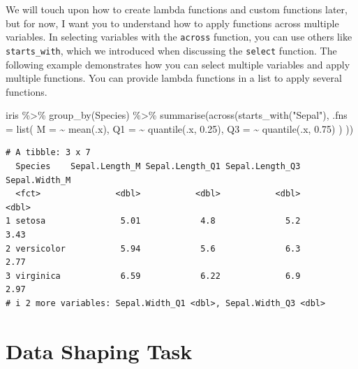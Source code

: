 \documentclass[
  a4paper,
]{book}
\newenvironment{Shaded}{\begin{snugshade}}{\end{snugshade}}
\newcommand{\AttributeTok}[1]{\textcolor[rgb]{0.40,0.45,0.13}{#1}}
\newcommand{\FloatTok}[1]{\textcolor[rgb]{0.68,0.00,0.00}{#1}}
\newcommand{\FunctionTok}[1]{\textcolor[rgb]{0.28,0.35,0.67}{#1}}
\newcommand{\NormalTok}[1]{\textcolor[rgb]{0.00,0.23,0.31}{#1}}
\newcommand{\SpecialCharTok}[1]{\textcolor[rgb]{0.37,0.37,0.37}{#1}}
\newcommand{\StringTok}[1]{\textcolor[rgb]{0.13,0.47,0.30}{#1}}
\begin{document}
We will touch upon how to create lambda functions and custom functions
later, but for now, I want you to understand how to apply functions
across multiple variables. In selecting variables with the
\texttt{across} function, you can use others like \texttt{starts\_with},
which we introduced when discussing the \texttt{select} function. The
following example demonstrates how you can select multiple variables and
apply multiple functions. You can provide lambda functions in a list to
apply several functions.

\begin{Shaded}
\begin{Highlighting}[]
\NormalTok{iris }\SpecialCharTok{\%\textgreater{}\%}
  \FunctionTok{group\_by}\NormalTok{(Species) }\SpecialCharTok{\%\textgreater{}\%}
  \FunctionTok{summarise}\NormalTok{(}\FunctionTok{across}\NormalTok{(}\FunctionTok{starts\_with}\NormalTok{(}\StringTok{"Sepal"}\NormalTok{),}
    \AttributeTok{.fns =} \FunctionTok{list}\NormalTok{(}
      \AttributeTok{M =} \SpecialCharTok{\textasciitilde{}} \FunctionTok{mean}\NormalTok{(.x),}
      \AttributeTok{Q1 =} \SpecialCharTok{\textasciitilde{}} \FunctionTok{quantile}\NormalTok{(.x, }\FloatTok{0.25}\NormalTok{),}
      \AttributeTok{Q3 =} \SpecialCharTok{\textasciitilde{}} \FunctionTok{quantile}\NormalTok{(.x, }\FloatTok{0.75}\NormalTok{)}
\NormalTok{    )}
\NormalTok{  ))}
\end{Highlighting}
\end{Shaded}

\begin{verbatim}
# A tibble: 3 x 7
  Species    Sepal.Length_M Sepal.Length_Q1 Sepal.Length_Q3 Sepal.Width_M
  <fct>               <dbl>           <dbl>           <dbl>         <dbl>
1 setosa               5.01            4.8              5.2          3.43
2 versicolor           5.94            5.6              6.3          2.77
3 virginica            6.59            6.22             6.9          2.97
# i 2 more variables: Sepal.Width_Q1 <dbl>, Sepal.Width_Q3 <dbl>
\end{verbatim}

\section{Data Shaping Task}\label{data-shaping-task}
\end{document}
